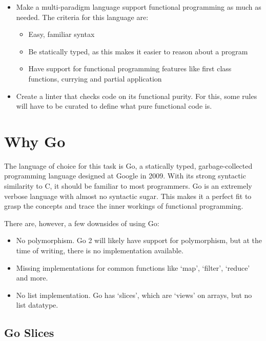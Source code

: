 \begin{itemize}
    \item Make a multi-paradigm language support functional programming as much as needed.
        The criteria for this language are:
    \begin{itemize}
        \item Easy, familiar syntax
        \item Be statically typed, as this makes it easier to reason about a program
        \item Have support for functional programming features like first class functions, currying
            and partial application
    \end{itemize}
    \item Create a linter that checks code on its functional purity. For this, some rules will have
        to be curated to define what pure functional code is.
\end{itemize}

\section{Why Go}

The language of choice for this task is Go, a statically typed, garbage-collected programming language
designed at Google in 2009\autocite{golang-publish}. With its strong syntactic similarity to C, it should
be familiar to most programmers.
Go is an extremely verbose language with almost no syntactic sugar. This makes it a perfect fit to
grasp the concepts and trace the inner workings of functional programming.

There are, however, a few downsides of using Go:

\begin{itemize}
    \item No polymorphism. Go 2 will likely have support for polymorphism, but at the time of writing,
        there is no implementation available.
    \item Missing implementations for common functions like `map', `filter', `reduce' and more.
    \item No list implementation. Go has `slices', which are `views' on arrays, but
        no list datatype.
\end{itemize}

\subsection{Go Slices}

